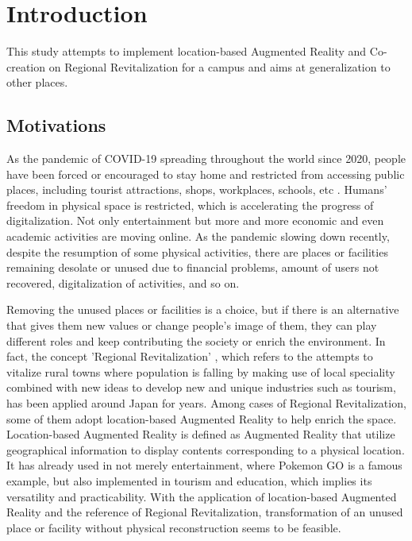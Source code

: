 \chapter{Introduction}

This study attempts to implement location-based Augmented Reality and Co-creation on Regional Revitalization for a campus and aims at generalization to other places.

\section{Motivations}

As the pandemic of COVID-19 spreading throughout the world since 2020,
people have been forced or encouraged to stay home and restricted from accessing public places,
including tourist attractions, shops, workplaces, schools, etc \cite{sandford_2020} \cite{hirsch_2020}.
Humans' freedom in physical space is restricted, which is accelerating the progress of digitalization.
Not only entertainment but more and more economic and even academic activities are moving online.
As the pandemic slowing down recently, despite the resumption of some physical activities,
there are places or facilities remaining desolate or unused due to financial problems,
amount of users not recovered, digitalization of activities, and so on.

Removing the unused places or facilities is a choice, but if there is an alternative that gives them new values or change people's image of them,
they can play different roles and keep contributing the society or enrich the environment.
In fact, the concept 'Regional Revitalization' \cite{japangov} \cite{sawaji_2019}, which refers to the attempts to vitalize rural towns where population is falling
by making use of local speciality combined with new ideas to develop new and unique industries such as tourism, has been applied around Japan for years.
Among cases of Regional Revitalization, some of them adopt location-based Augmented Reality to help enrich the space.
Location-based Augmented Reality is defined as Augmented Reality that utilize geographical information to display contents corresponding to a physical location.
It has already used in not merely entertainment, where Pokemon GO is a famous example,
but also implemented in tourism and education, which implies its versatility and practicability.
With the application of location-based Augmented Reality and the reference of Regional Revitalization,
transformation of an unused place or facility without physical reconstruction seems to be feasible.

